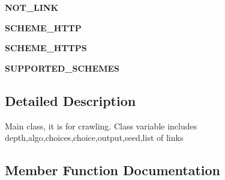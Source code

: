 \begin{DoxyCompactItemize}
\item 
{\bfseries N\+O\+T\+\_\+\+L\+I\+NK}\hypertarget{class_web___crawler_1_1_web___crawler_afc29d8ed81f983bb7cfc5d93c38a81b4}{}\label{class_web___crawler_1_1_web___crawler_afc29d8ed81f983bb7cfc5d93c38a81b4}

\item 
{\bfseries S\+C\+H\+E\+M\+E\+\_\+\+H\+T\+TP}\hypertarget{class_web___crawler_1_1_web___crawler_a8f8a86f62cfb6353950e470d75c4f427}{}\label{class_web___crawler_1_1_web___crawler_a8f8a86f62cfb6353950e470d75c4f427}

\item 
{\bfseries S\+C\+H\+E\+M\+E\+\_\+\+H\+T\+T\+PS}\hypertarget{class_web___crawler_1_1_web___crawler_a956b96a3fc5c1e2a770ab2c733196a3c}{}\label{class_web___crawler_1_1_web___crawler_a956b96a3fc5c1e2a770ab2c733196a3c}

\item 
{\bfseries S\+U\+P\+P\+O\+R\+T\+E\+D\+\_\+\+S\+C\+H\+E\+M\+ES}\hypertarget{class_web___crawler_1_1_web___crawler_a8a7e2e14c4659d69cca337d6f18d9531}{}\label{class_web___crawler_1_1_web___crawler_a8a7e2e14c4659d69cca337d6f18d9531}

\end{DoxyCompactItemize}


\subsection{Detailed Description}
\begin{DoxyVerb}Main class, it is for crawling.
Class variable includes depth,algo,choices,choice,output,seed,list of links
\end{DoxyVerb}
 

\subsection{Member Function Documentation}
